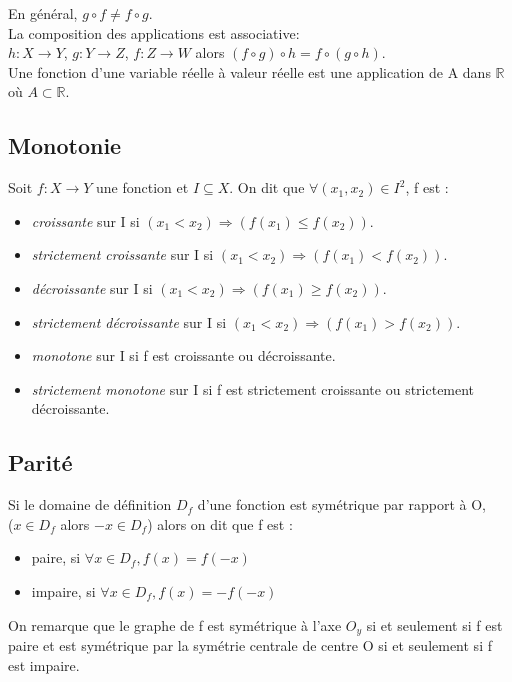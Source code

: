 \documentclass[a4paper,10pt]{book}
\begin{document}
En général, $g\circ f \ne f\circ g$.\\

La composition des applications est associative:\\
$h : X \longrightarrow Y$, $g : Y \longrightarrow Z$, $f : Z \longrightarrow W$ alors $(f\circ g)\circ h=f\circ (g\circ h)$.\\

Une fonction d'une variable réelle à valeur réelle est une application de A dans $\mathbb{R}$ où $A \subset \mathbb{R}$.

\subsection{Monotonie}
Soit $f : X \longrightarrow Y$ une fonction et $I\subseteq X$. On dit que $\forall (x_{1},x_{2}) \in I^{2}$, f est :\\
\begin{itemize}\renewcommand{\labelitemi}{$\bullet$}
\item \emph{croissante} sur I si $(x_{1}<x_{2})\Longrightarrow (f(x_{1})\leq f(x_{2}))$.
\item \emph{strictement croissante} sur I si $(x_{1}<x_{2})\Longrightarrow (f(x_{1}) < f(x_{2}))$.
\item \emph{décroissante} sur I si $(x_{1}<x_{2})\Longrightarrow (f(x_{1})\geq f(x_{2}))$.
\item \emph{strictement décroissante} sur I si $(x_{1}<x_{2})\Longrightarrow (f(x_{1}) > f(x_{2}))$.
\item \emph{monotone} sur I si f est croissante ou décroissante.
\item \emph{strictement monotone} sur I si f est strictement croissante ou strictement décroissante.
\end{itemize}

\subsection{Parité}
Si le domaine de définition $D_{f}$ d'une fonction est symétrique par rapport à O,\\
($x \in D_{f}$ alors $-x \in D_{f}$) alors on dit que f est :
\begin{itemize}\renewcommand{\labelitemi}{$\bullet$}
\item paire, si $\forall x \in D_{f}, f(x)=f(-x)$
\item impaire, si $\forall x \in D_{f}, f(x)=-f(-x)$\\
\end{itemize}
On remarque que le graphe de f est symétrique à l'axe $O_{y}$ si et seulement si f est paire et est symétrique par la symétrie centrale de centre O si et seulement si f est impaire.\\
\end{document}
